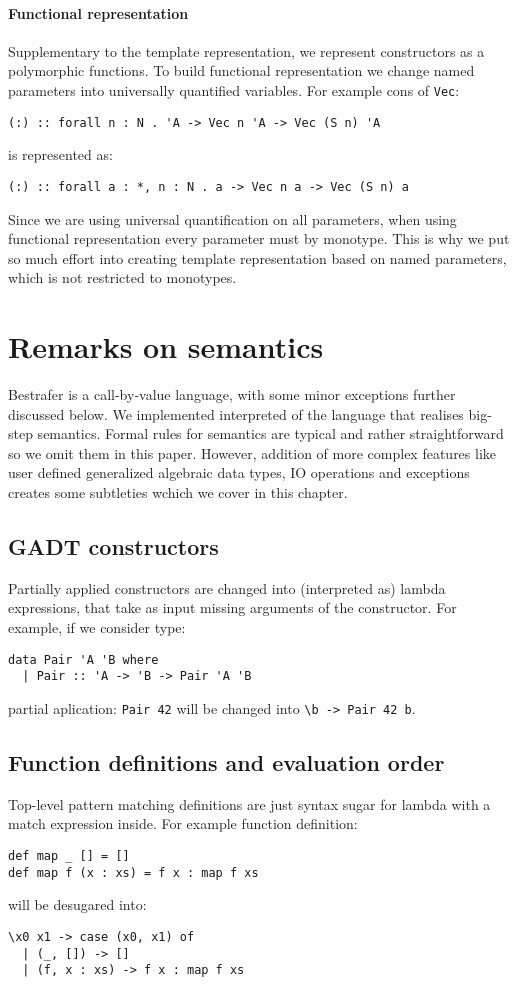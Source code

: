 \documentclass[declaration,shortabstract,english]{iithesis}
\begin{document}
\subsubsection*{Functional representation}
Supplementary to the template representation, we represent constructors as a polymorphic functions.
To build functional representation we change named parameters into universally quantified variables.
For example cons of \verb+Vec+:
\begin{verbatim}
(:) :: forall n : N . 'A -> Vec n 'A -> Vec (S n) 'A
\end{verbatim}
is represented as:
\begin{verbatim}
(:) :: forall a : *, n : N . a -> Vec n a -> Vec (S n) a
\end{verbatim}
Since we are using universal quantification on all parameters,
when using functional representation every parameter must by monotype.
This is why we put so much effort into creating template representation based on named
parameters, which is not restricted to monotypes.

\chapter{Remarks on semantics}
Bestrafer is a call-by-value language, with some minor exceptions further discussed below.
We implemented interpreted of the language that realises big-step semantics.
Formal rules for semantics are typical and rather straightforward so we omit them in this paper. However, addition
of more complex features like user defined generalized algebraic data types, IO operations and exceptions creates
some subtleties wchich we cover in this chapter.
\section{GADT constructors}
Partially applied constructors are changed into (interpreted as) lambda expressions, that take as input missing arguments of the constructor.
For example, if we consider type:
\begin{verbatim}
data Pair 'A 'B where
  | Pair :: 'A -> 'B -> Pair 'A 'B
\end{verbatim}
partial aplication: \verb+Pair 42+ will be changed into \verb+\b -> Pair 42 b+.
\section{Function definitions and evaluation order}
Top-level pattern matching definitions are just syntax sugar for lambda with a match expression inside.
For example function definition:
\begin{verbatim}
def map _ [] = []
def map f (x : xs) = f x : map f xs
\end{verbatim}
will be desugared into:
\begin{verbatim}
\x0 x1 -> case (x0, x1) of
  | (_, []) -> []
  | (f, x : xs) -> f x : map f xs
\end{verbatim}
\end{document}
